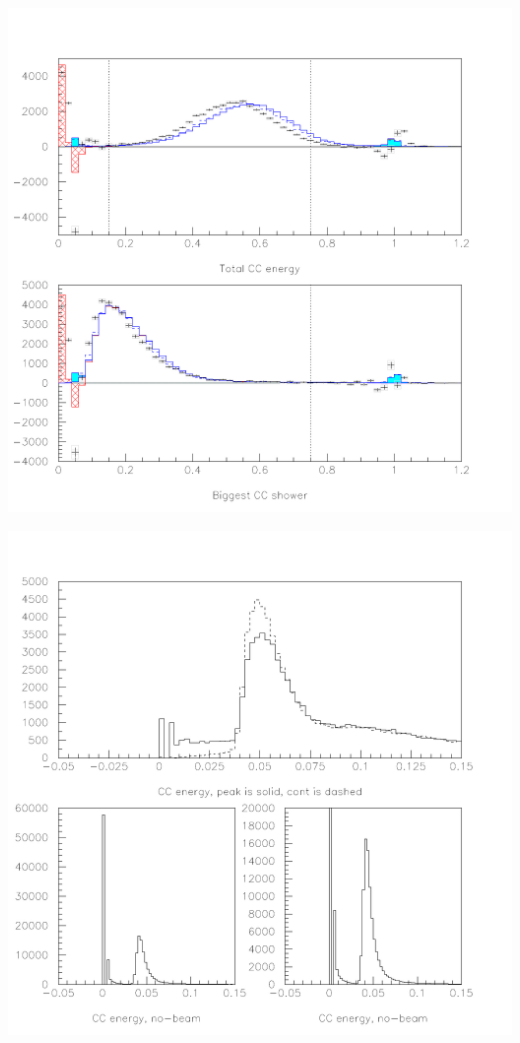 \documentclass[landscape]{article}
\begin{document}
\begin{center}
  \includegraphics[height=\textheight]{tr2_cc_before_visen.pdf}
\end{center}

\begin{center}
  \includegraphics[height=\textheight]{tr2_cc_netherregions.pdf}
\end{center}
\end{document}
